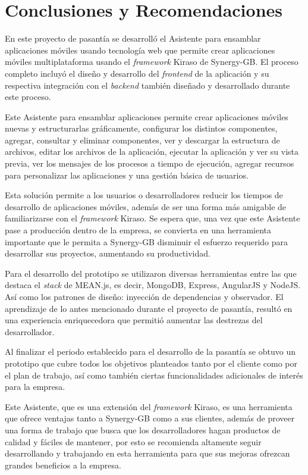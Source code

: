 \chapter{Conclusiones y Recomendaciones} 

\label{chap:conclusiones}

En este proyecto de pasantía se desarrolló el Asistente para ensamblar aplicaciones móviles usando tecnología web que permite crear aplicaciones móviles multiplataforma usando el \textit{framework} Kiraso de Synergy-GB. El proceso completo incluyó el diseño y desarrollo del \textit{frontend} de la aplicación y su respectiva integración con el \textit{backend} también diseñado y desarrollado durante este proceso. 


Este Asistente para ensamblar aplicaciones permite crear aplicaciones móviles nuevas y estructurarlas gráficamente, configurar los distintos componentes, agregar, consultar y eliminar componentes, ver y descargar la estructura de archivos, editar los archivos de la aplicación, ejecutar la aplicación y ver su vista previa, ver los mensajes de los procesos a tiempo de ejecución, agregar recursos para personalizar las aplicaciones y una gestión básica de usuarios. 


Esta solución permite a los usuarios o desarrolladores reducir los tiempos de desarrollo de aplicaciones móviles, además de ser una forma más amigable de familiarizarse con el \textit{framework} Kiraso. Se espera que, una vez que este Asistente pase a producción dentro de la empresa, se convierta en una herramienta importante que le permita a Synergy-GB disminuir el esfuerzo requerido para desarrollar sus proyectos, aumentando su productividad.


Para el desarrollo del prototipo se utilizaron diversas herramientas entre las que destaca el \textit{stack} de MEAN.js, es decir, MongoDB, Express, AngularJS y NodeJS. Así como los patrones de diseño: inyección de dependencias y observador. El aprendizaje de lo antes mencionado durante el proyecto de pasantía, resultó en una experiencia enriquecedora que permitió aumentar las destrezas del desarrollador. 


Al finalizar el periodo establecido para el desarrollo de la pasantía se obtuvo un prototipo que cubre todos los objetivos planteados tanto por el cliente como por el plan de trabajo, así como también ciertas funcionalidades adicionales de interés para la empresa. 


Este Asistente, que es una extensión del \textit{framework} Kiraso, es una herramienta que ofrece ventajas tanto a Synergy-GB como a sus clientes, además de proveer una forma de trabajo que busca que los desarrolladores hagan productos de calidad y fáciles de mantener, por esto se recomienda altamente seguir desarrollando y trabajando en esta herramienta para que sus mejoras ofrezcan grandes beneficios a la empresa.

